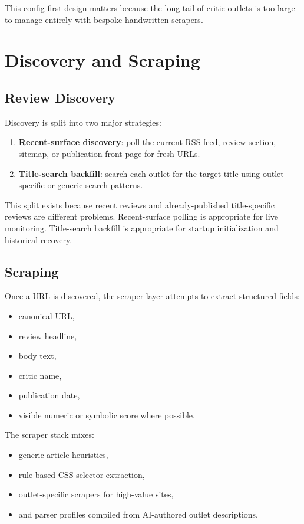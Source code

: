 \documentclass[11pt]{article}
\begin{document}
This config-first design matters because the long tail of critic outlets is too large to manage entirely with bespoke handwritten scrapers.

\section{Discovery and Scraping}
\subsection{Review Discovery}
Discovery is split into two major strategies:
\begin{enumerate}[leftmargin=1.5em]
    \item \textbf{Recent-surface discovery}: poll the current RSS feed, review section, sitemap, or publication front page for fresh URLs.
    \item \textbf{Title-search backfill}: search each outlet for the target title using outlet-specific or generic search patterns.
\end{enumerate}

This split exists because recent reviews and already-published title-specific reviews are different problems. Recent-surface polling is appropriate for live monitoring. Title-search backfill is appropriate for startup initialization and historical recovery.

\subsection{Scraping}
Once a URL is discovered, the scraper layer attempts to extract structured fields:
\begin{itemize}[leftmargin=1.5em]
    \item canonical URL,
    \item review headline,
    \item body text,
    \item critic name,
    \item publication date,
    \item visible numeric or symbolic score where possible.
\end{itemize}

The scraper stack mixes:
\begin{itemize}[leftmargin=1.5em]
    \item generic article heuristics,
    \item rule-based CSS selector extraction,
    \item outlet-specific scrapers for high-value sites,
    \item and parser profiles compiled from AI-authored outlet descriptions.
\end{itemize}
\end{document}
